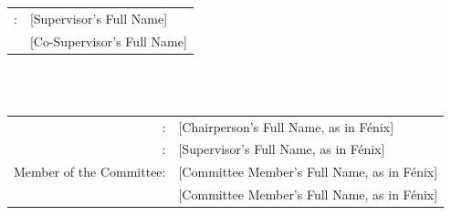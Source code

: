 \begin{center}
\vspace{1.0cm}
{\FontSn %
\begin{tabular}{ll}
	\coverSupervisors: & [Supervisor's Full Name] \\
	                   & [Co-Supervisor's Full Name]
\end{tabular} } \\

\vspace{1.0cm}
{\FontMb \coverExaminationCommittee} \\
\vspace{0.3cm}
{\FontSn %
\begin{tabular}{rl}
	  \coverChairperson:    & [Chairperson's Full Name, as in Fénix]  \\
	  \coverSupervisor:     & [Supervisor's Full Name, as in Fénix]   \\
	Member of the Committee:	& [Committee Member's Full Name, as in Fénix] \\
								& [Committee Member's Full Name, as in Fénix]
\end{tabular} } \\

\vspace{1.5cm}
{} \\ 


\end{center}

